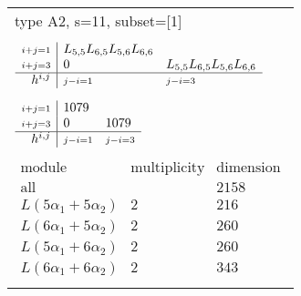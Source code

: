 \documentclass[crop,border=2mm]{standalone}
\begin{document}
\begin{tabular}{l}
{\huge type A2, s=11, subset=[1]}\\ \\


$\displaystyle
\begin{array}{r|l l}
	{\scriptstyle i+j=1}&L_{5,5}L_{6,5}L_{5,6}L_{6,6}&\\
	{\scriptstyle i+j=3}&0&L_{5,5}L_{6,5}L_{5,6}L_{6,6}\\
	\hline h^{i,j}&{\scriptstyle j-i=1}&{\scriptstyle j-i=3}
\end{array}
$ \\ \\


$\displaystyle
\begin{array}{r|l l}
	{\scriptstyle i+j=1}&1079&\\
	{\scriptstyle i+j=3}&0&1079\\
	\hline h^{i,j}&{\scriptstyle j-i=1}&{\scriptstyle j-i=3}
\end{array}
$ \\ \\


$\displaystyle
\begin{array}{rll}
	\text{module}&\text{multiplicity}&\text{dimension} \\ \hline \text{all}&&2158 \\
	L\left( 5\alpha_{1}+ 5\alpha_{2}\right)&2&216\\
	L\left( 6\alpha_{1}+ 5\alpha_{2}\right)&2&260\\
	L\left( 5\alpha_{1}+ 6\alpha_{2}\right)&2&260\\
	L\left( 6\alpha_{1}+ 6\alpha_{2}\right)&2&343
\end{array}
$ \\ \\

\end{tabular}
\end{document}
